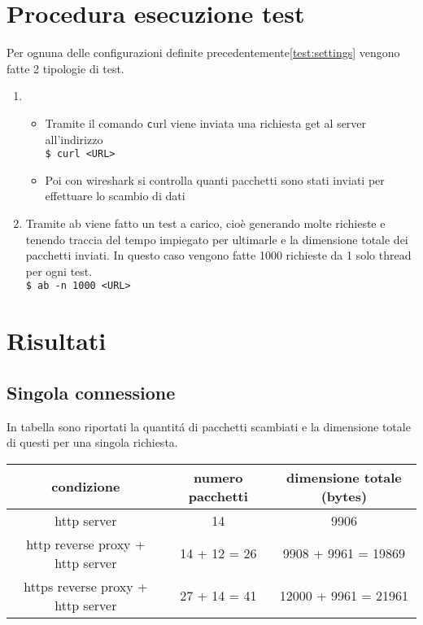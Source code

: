 \section{Procedura esecuzione test}
Per ognuna delle configurazioni definite precedentemente\ref{test:settings} vengono fatte 2 tipologie di test.
\begin{enumerate}
  \item
    \begin{itemize}
      \item Tramite il comando \texttt curl viene inviata una richiesta get al server all'indirizzo\\
        \texttt{\$ curl <URL>}
        \item Poi con wireshark si controlla quanti pacchetti sono stati inviati per effettuare lo scambio di dati

    \end{itemize}
  \item Tramite ab viene fatto un test a carico, cioè generando molte richieste e tenendo traccia del tempo impiegato per ultimarle e la dimensione totale dei pacchetti inviati. In questo caso vengono fatte 1000 richieste da 1 solo thread per ogni test.\\
    \texttt{\$ ab -n 1000 <URL>}

\end{enumerate}

\section{Risultati}
\subsection{Singola connessione}
In tabella sono riportati la quantitá di pacchetti scambiati e la dimensione totale di questi per una singola richiesta.
\begin{center}
  \begin{tabular}{|c|c|c|}
    \hline
    condizione & numero pacchetti & dimensione totale (bytes) \\
    \hline
    \hline
    http server & 14 & 9906 \\
    \hline
    http reverse proxy + http server & 14 + 12 = 26 & 9908 + 9961 = 19869 \\
    \hline
    https reverse proxy + http server & 27 + 14 = 41 & 12000 + 9961 = 21961 \\
    \hline
  \end{tabular}
\end{center}
\begin{center}
\end{center}


